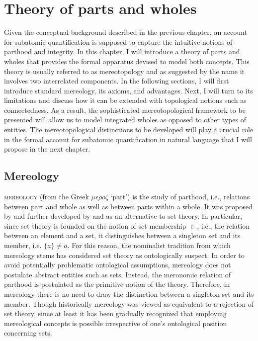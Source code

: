 \chapter{Theory of parts and wholes}\label{ch:theory-of-parts-and-wholes}

Given the conceptual background described in the previous chapter, an account for subatomic quantification is supposed to capture the intuitive notions of parthood and integrity. In this chapter, I will introduce a theory of parts and wholes that provides the formal apparatus devised to model both concepts. This theory is usually referred to as mereotopology and as suggested by the name it involves two interrelated components. In the following sections, I will first introduce standard mereology, its axioms, and advantages. Next, I will turn to its limitations and discuss how it can be extended with topological notions such as connectedness. As a result, the sophisticated mereotopological framework to be presented will allow us to model integrated wholes as opposed to other types of entities. The mereotopological distinctions to be developed will play a crucial role in the formal account for subatomic quantification in natural language that I will propose in the next chapter.

\section{Mereology}\label{sec:mereology}

\textsc{mereology} (from the Greek $\mu\epsilon\rho o\zeta$ `part') is the study of parthood, i.e., relations between part and whole as well as between parts within a whole. It was proposed by \citet{lesniewski1916podstawy} and further developed by \citet{leonard_goodman1940calculus} and \citet{goodman1951structure} as an alternative to set theory. In particular, since set theory is founded on the notion of set membership $\in$, i.e., the relation between an element and a set, it distinguishes between a singleton set and its member, i.e. $\{a\} \neq a$. For this reason, the nominalist tradition from which mereology stems has considered set theory as ontologically suspect. In order to avoid potentially problematic ontological assumptions, mereology does not postulate abstract entities such as sets. Instead, the meronomic relation of parthood is postulated as the primitive notion of the theory. Therefore, in mereology there is no need to draw the distinction between a singleton set and its member. Though historically mereology was viewed as equivalent to a rejection of set theory, since at least \citet{eberle2012nominalistic} it has been gradually recognized that employing mereological concepts is possible irrespective of one's ontological position concerning sets.

